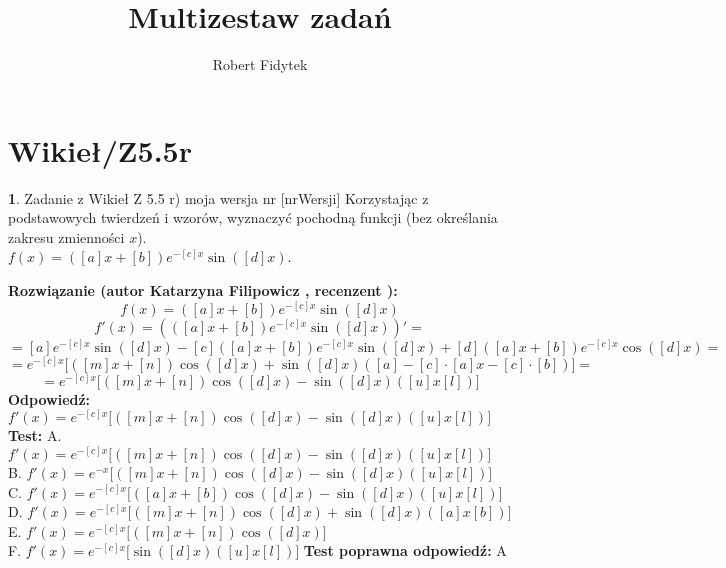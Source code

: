\documentclass[12pt, a4paper]{article}
\title{Multizestaw zadań}
\author{Robert Fidytek}
\date{}
\theoremstyle{definition} %
\newtheorem{zad}{}
\newcommand{\kategoria}[1]{\section{#1}} %
\newcommand{\zadStart}[1]{\begin{zad}#1\newline} %
\newcommand{\zadStop}{\end{zad}}   %
\newcommand{\rozwStart}[2]{\noindent \textbf{Rozwiązanie (autor #1 , recenzent #2): }\newline} %
\newcommand{\rozwStop}{\newline}                                            %
\newcommand{\odpStart}{\noindent \textbf{Odpowiedź:}\newline}    %
\newcommand{\odpStop}{\newline}                                             %
\newcommand{\testStart}{\noindent \textbf{Test:}\newline} %
\newcommand{\testStop}{\newline} %
\newcommand{\kluczStart}{\noindent \textbf{Test poprawna odpowiedź:}\newline} %
\newcommand{\kluczStop}{\newline} %
\begin{document}
\maketitle


\kategoria{Wikieł/Z5.5r}
\zadStart{Zadanie z Wikieł Z 5.5 r) moja wersja nr [nrWersji]}
Korzystając z podstawowych twierdzeń i wzorów, wyznaczyć pochodną funkcji (bez określania zakresu zmienności $x$).\\ 
$f(x)=([a]x+[b])e^{-[c]x}\sin([d]x)$.
\zadStop
\rozwStart{Katarzyna Filipowicz}{}
$$f(x)=([a]x+[b])e^{-[c]x}\sin([d]x)$$
$$f'(x)=\left(([a]x+[b])e^{-[c]x}\sin([d]x)\right)' = $$
$$ = [a]e^{-[c]x}\sin([d]x)-[c]([a]x+[b])e^{-[c]x}\sin([d]x)+[d]([a]x+[b])e^{-[c]x}\cos([d]x)=
$$ $$
=e^{-[c]x}\Big[([m]x+[n])\cos([d]x)+\sin([d]x)([a]-[c]\cdot[a]x-[c]\cdot[b])\Big]=
$$ $$
=e^{-[c]x}\Big[([m]x+[n])\cos([d]x)-\sin([d]x)([u]x [l])\Big]
$$
\rozwStop
\odpStart
$ f'(x)=e^{-[c]x}\Big[([m]x+[n])\cos([d]x)-\sin([d]x)([u]x [l])\Big]$
\odpStop
\testStart
A. $ f'(x)=e^{-[c]x}\Big[([m]x+[n])\cos([d]x)-\sin([d]x)([u]x [l])\Big]$\\
B. $ f'(x)=e^{-x}\Big[([m]x+[n])\cos([d]x)-\sin([d]x)([u]x [l])\Big]$\\
C. $ f'(x)=e^{-[c]x}\Big[([a]x+[b])\cos([d]x)-\sin([d]x)([u]x [l])\Big]$ \\
D. $ f'(x)=e^{-[c]x}\Big[([m]x+[n])\cos([d]x)+\sin([d]x)([a]x [b])\Big]$\\
E. $ f'(x)=e^{-[c]x}\Big[([m]x+[n])\cos([d]x)\Big]$\\
F. $ f'(x)=e^{-[c]x}\Big[\sin([d]x)([u]x [l])\Big]$
\testStop
\kluczStart
A
\kluczStop
\end{document}
